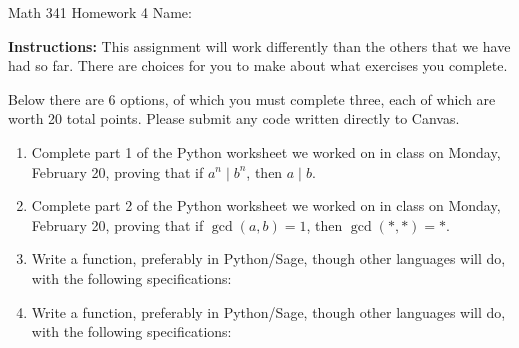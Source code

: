 \documentclass[12pt]{article}
\begin{document}
	Math 341 Homework 4
	\hfill
	Name: \underline{\hspace*{2in}}
	
	\textbf{Instructions:} This assignment will work differently than the others that we have had so far. There are choices for you to make about what exercises you complete.
	
	Below there are 6 options, of which you must complete three, each of which are worth 20 total points. Please submit any code written directly to Canvas.
\begin{enumerate}
	\item Complete part 1 of the Python worksheet we worked on in class on Monday, February 20, proving that if $a^n\mid b^n$, then $a\mid b$.
	\item Complete part 2 of the Python worksheet we worked on in class on Monday, February 20, proving that if $\gcd(a,b)=1$, then $\gcd(*,*)=*$.
	
	\item Write a function, preferably in Python/Sage, though other languages will do, with the following specifications:
	

\item Write a function, preferably in Python/Sage, though other languages will do, with the following specifications:

\end{enumerate}
\end{document}
